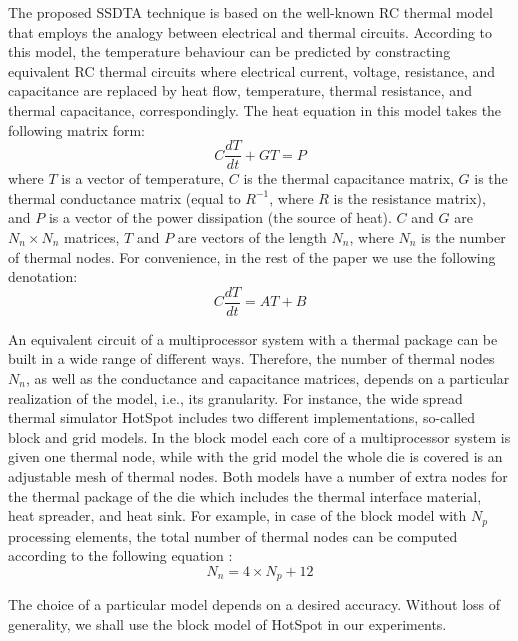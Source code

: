 The proposed SSDTA technique is based on the well-known RC thermal model that employs the analogy between electrical and thermal circuits. According to this model, the temperature behaviour can be predicted by constracting equivalent RC thermal circuits where electrical current, voltage, resistance, and capacitance are replaced by heat flow, temperature, thermal resistance, and thermal capacitance, correspondingly. The heat equation in this model takes the following matrix form:
\begin{equation} \label{eq:thermal-ode}
  C \frac{dT}{dt} + G T = P
\end{equation}
where $T$ is a vector of temperature, $C$ is the thermal capacitance matrix, $G$ is the thermal conductance matrix (equal to $R^{-1}$, where $R$ is the resistance matrix), and $P$ is a vector of the power dissipation (the source of heat). $C$ and $G$ are $N_n \times N_n$ matrices, $T$ and $P$ are vectors of the length $N_n$, where $N_n$ is the number of thermal nodes. For convenience, in the rest of the paper we use the following denotation:
\begin{equation} \label{eq:initial}
  C \frac{dT}{dt} = A T + B
\end{equation}

An equivalent circuit of a multiprocessor system with a thermal package can be built in a wide range of different ways. Therefore, the number of thermal nodes $N_n$, as well as the conductance and capacitance matrices, depends on a particular realization of the model, i.e., its granularity. For instance, the wide spread thermal simulator HotSpot \cite{huang2006} includes two different implementations, so-called block and grid models. In the block model each core of a multiprocessor system is given one thermal node, while with the grid model the whole die is covered is an adjustable mesh of thermal nodes. Both models have a number of extra nodes for the thermal package of the die which includes the thermal interface material, heat spreader, and heat sink. For example, in case of the block model with $N_p$ processing elements, the total number of thermal nodes can be computed according to the following equation \cite{rao2008}:
\begin{equation} \label{eq:nodes}
  N_n = 4 \times N_p + 12
\end{equation}

The choice of a particular model depends on a desired accuracy. Without loss of generality, we shall use the block model of HotSpot in our experiments.
